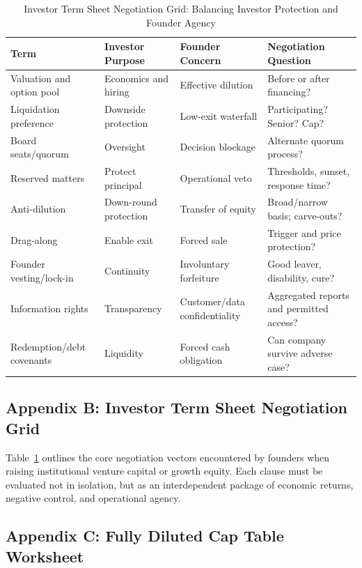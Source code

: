 \begin{table}[t]
\centering
\small
\caption{Investor Term Sheet Negotiation Grid: Balancing Investor Protection and Founder Agency}
\label{tab:ch35_term_sheet_grid}
\begin{tabularx}{\textwidth}{p{3.8cm} p{3.2cm} p{3.5cm} X}
\toprule
\textbf{Term} & \textbf{Investor Purpose} & \textbf{Founder Concern} & \textbf{Negotiation Question} \\
\midrule
Valuation and option pool & Economics and hiring & Effective dilution & Before or after financing? \\
Liquidation preference & Downside protection & Low-exit waterfall & Participating? Senior? Cap? \\
Board seats/quorum & Oversight & Decision blockage & Alternate quorum process? \\
Reserved matters & Protect principal & Operational veto & Thresholds, sunset, response time? \\
Anti-dilution & Down-round protection & Transfer of equity & Broad/narrow basis; carve-outs? \\
Drag-along & Enable exit & Forced sale & Trigger and price protection? \\
Founder vesting/lock-in & Continuity & Involuntary forfeiture & Good leaver, disability, cure? \\
Information rights & Transparency & Customer/data confidentiality & Aggregated reports and permitted access? \\
Redemption/debt covenants & Liquidity & Forced cash obligation & Can company survive adverse case? \\
\bottomrule
\end{tabularx}
\end{table}

\subsection{Appendix B: Investor Term Sheet Negotiation Grid}

Table~\ref{tab:ch35_term_sheet_grid} outlines the core negotiation vectors encountered by founders when raising institutional venture capital or growth equity. Each clause must be evaluated not in isolation, but as an interdependent package of economic returns, negative control, and operational agency.

\subsection{Appendix C: Fully Diluted Cap Table Worksheet}

